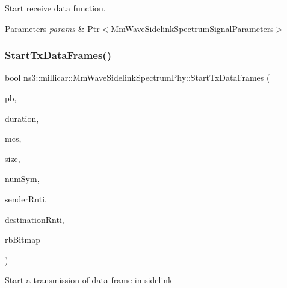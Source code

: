 Start receive data function. 


\begin{DoxyParams}{Parameters}
{\em params} & Ptr$<$\+Mm\+Wave\+Sidelink\+Spectrum\+Signal\+Parameters$>$ \\
\hline
\end{DoxyParams}
\mbox{\label{classns3_1_1millicar_1_1MmWaveSidelinkSpectrumPhy_ae3703a686eae8ac683c726aeb93cfb6b}} 
\subsubsection{\texorpdfstring{Start\+Tx\+Data\+Frames()}{StartTxDataFrames()}}
{\footnotesize\ttfamily bool ns3\+::millicar\+::\+Mm\+Wave\+Sidelink\+Spectrum\+Phy\+::\+Start\+Tx\+Data\+Frames (\begin{DoxyParamCaption}\item[{Ptr$<$ Packet\+Burst $>$}]{pb,  }\item[{Time}]{duration,  }\item[{uint8\+\_\+t}]{mcs,  }\item[{uint32\+\_\+t}]{size,  }\item[{uint8\+\_\+t}]{num\+Sym,  }\item[{uint16\+\_\+t}]{sender\+Rnti,  }\item[{uint16\+\_\+t}]{destination\+Rnti,  }\item[{std\+::vector$<$ int $>$}]{rb\+Bitmap }\end{DoxyParamCaption})}

Start a transmission of data frame in sidelink


